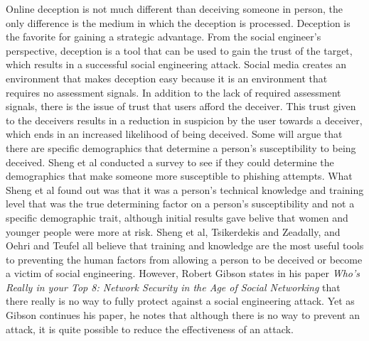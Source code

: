 \documentclass[conference]{IEEEtran}
\begin{document}
Online deception is not much different than deceiving someone in person, the only difference is the medium in which the deception is processed. Deception is the favorite for gaining a strategic advantage\cite{Tsikerdekis:2014:ODS:2663191.2629612}. From the social engineer's perspective, deception is a tool that can be used to gain the trust of the target, which results in a successful social engineering attack. Social media creates an environment that makes deception easy because it is an environment that requires no assessment signals\cite{Tsikerdekis:2014:ODS:2663191.2629612}.  In addition to the lack of required assessment signals, there is the issue of trust that users afford the deceiver.  This trust given to the deceivers results in a reduction in suspicion by the user towards a deceiver, which ends in an increased likelihood of being deceived\cite{Tsikerdekis:2014:ODS:2663191.2629612}.  Some will argue that there are specific demographics that determine a person’s susceptibility to being deceived.  Sheng et al conducted a survey to see if they could determine the demographics that make someone more susceptible to phishing attempts\cite{Sheng:2010:FPD:1753326.1753383}.  What Sheng et al found out was that it was a person's technical knowledge and training level that was the true determining factor on a person's susceptibility and not a specific demographic trait, although initial results gave belive that women and younger people were more at risk\cite{Sheng:2010:FPD:1753326.1753383}. Sheng et al\cite{Sheng:2010:FPD:1753326.1753383}, Tsikerdekis and Zeadally\cite{Tsikerdekis:2014:ODS:2663191.2629612}, and Oehri and Teufel \cite{6320436} all believe that training and knowledge are the most useful tools to preventing the human factors from allowing a person to be deceived or become a victim of social engineering.  However, Robert Gibson states in his paper \textit{Who's Really in your Top 8: Network Security in the Age of Social Networking} that there really is no way to fully protect against a social engineering attack\cite{Gibson:2007:WRY:1294046.1294077}.  Yet as Gibson continues his paper, he notes that although there is no way to prevent an attack, it is quite possible to reduce the effectiveness of an attack. 
\end{document}
